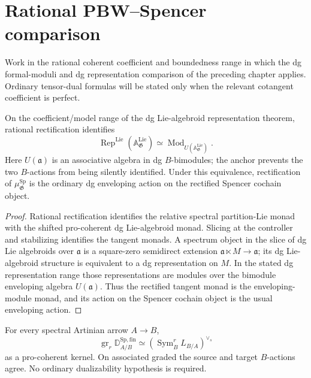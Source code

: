 \section{Rational PBW--Spencer comparison}
\label{sec:as-rational-pbw}

Work in the rational coherent coefficient and boundedness range in which the
dg formal-moduli and dg representation comparison of the preceding chapter
applies.  Ordinary tensor-dual formulas will be stated only when the
relevant cotangent coefficient is perfect.

\begin{theorem}
\label{thm:as-rational-enveloping-algebra}
On the coefficient/model range of the dg Lie-algebroid representation
theorem, rational rectification identifies
\[
\boxed{
    \operatorname{Rep}^{\mathrm{Lie}}
    \left(
        \mathbb A_{\mathfrak G}^{\mathrm{Lie}}
    \right)
    \simeq
    \operatorname{Mod}_{U(\mathbb A_{\mathfrak G}^{\mathrm{Lie}})}.
}
\]
Here $U(\mathfrak a)$ is an associative algebra in dg $B$-bimodules; the
anchor prevents the two $B$-actions from being silently identified.
Under this equivalence, rectification of
$\mu_{\mathfrak G}^{\mathrm{Sp}}$ is the ordinary dg enveloping action on the
rectified Spencer cochain object.
\end{theorem}

\begin{proof}
Rational rectification identifies the relative spectral partition-Lie monad
with the shifted pro-coherent dg Lie-algebroid monad.  Slicing at the
controller and stabilizing identifies the tangent monads.  A spectrum object
in the slice of dg Lie algebroids over $\mathfrak a$ is a square-zero
semidirect extension
$\mathfrak a\ltimes M\to\mathfrak a$; its dg Lie-algebroid structure is
equivalent to a dg representation on $M$.  In the stated dg representation
range those representations are modules over the bimodule enveloping algebra
$U(\mathfrak a)$.  Thus the rectified tangent monad is the enveloping-module
monad, and its action on the Spencer cochain object is the usual enveloping
action.
\end{proof}

\begin{proposition}
\label{prop:as-intrinsic-spencer-symbol}
For every spectral Artinian arrow $A\to B$,
\[
\boxed{
    \operatorname{gr}_r
    \mathbb D_{A/B}^{\mathrm{Sp,fin}}
    \simeq
    \left(
        \operatorname{Sym}_B^rL_{B/A}
    \right)^{\vee_s}
}
\]
as a pro-coherent kernel.  On associated graded the source and target
$B$-actions agree.  No ordinary dualizability hypothesis is required.
\end{proposition}

